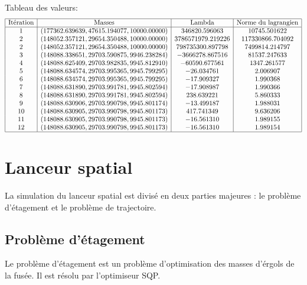 \documentclass[a4paper,20pt]{article}
\begin{document}
Tableau des valeurs:
$$
\begin{array}{|c|c|c|c|}
\hline
\text{It\'eration} & \text{Masses} & \text{Lambda} & \text{Norme du lagrangien} \\
\hline
1 & (177362.639639, 47615.194077, 10000.00000) & 346820.596063 & 10745.501622 \\
2 & (148052.357121, 29654.350488, 10000.00000) & 3786571979.219226 & 117330866.704092 \\
2 & (148052.357121, 29654.350488, 10000.00000) & 798735300.897798 & 7499814.214797 \\
3 & (148088.338651, 29703.590875, 9946.238284) &-3666278.867516 & 81537.247633 \\
4 & (148088.625409, 29703.982835, 9945.812910) &-60590.677561 & 1347.261577 \\
5 & (148088.634574, 29703.995365, 9945.799295) &-26.034761 & 2.006907 \\
6 & (148088.634574, 29703.995365, 9945.799295) &-17.909327 & 1.990368 \\
7 & (148088.631890, 29703.991781, 9945.802594) &-17.908987 & 1.990366 \\
8 & (148088.631890, 29703.991781, 9945.802594) &238.639221 & 5.860333 \\
9 & (148088.630906, 29703.990798, 9945.801174) &-13.499187 & 1.988031 \\
10 & (148088.630905, 29703.990798, 9945.801173) &417.741349 & 9.636206 \\
11 & (148088.630905, 29703.990798, 9945.801173) &-16.561310 & 1.989155 \\
12 & (148088.630905, 29703.990798, 9945.801173) &-16.561310 & 1.989154 \\
\hline
\end{array}
$$

\section{Lanceur spatial}
La simulation du lanceur spatial est divis\'e en deux parties majeures : le
 probl\`eme d'\'etagement et le probl\`eme de trajectoire.

\subsection{Probl\`eme d'\'etagement}
Le probl\`eme d'\'etagement est un probl\`eme d'optimisation des masses
 d'\'ergols de la fus\'ee. Il est r\'esolu par l'optimiseur SQP.
\end{document}
